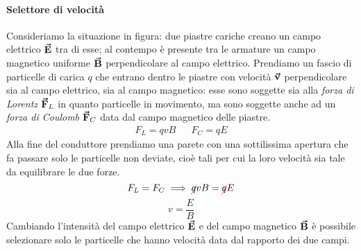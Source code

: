 \paragraph{Selettore di velocità}
Consideriamo la situazione in figura: due piastre cariche creano un campo elettrico $\vb*{\va{E}}$ tra di esse; al contempo è presente tra le armature un campo magnetico uniforme $\vb*{\va{B}}$ perpendicolare al campo elettrico.
Prendiamo un fascio di particelle di carica $q$ che entrano dentro le piastre con velocità $\vb*{\va{v}}$ perpendicolare sia al campo elettrico, sia al campo magnetico: esse sono soggette sia alla \textit{forza di Lorentz} $\vb*{\va{F}}_L$ in quanto particelle in movimento, ma sono soggette anche ad un \textit{forza di Coulomb} $\vb*{\va{F}}_C$ data dal campo magnetico delle piastre.
\begin{align*}
	F_L=qvB&&F_C=qE
\end{align*}
Alla fine del conduttore prendiamo una parete con una sottilissima apertura che fa passare solo le particelle non deviate, cioè tali per cui la loro velocità sia tale da equilibrare le due forze.
\begin{equation*}
	F_L=F_C\implies \Ccancel[red]{q}vB=\Ccancel[red]{q}E
\end{equation*}
\begin{equation}
	v=\frac{E}{B}
\end{equation}
Cambiando l'intensità del campo elettrico $\vb*{\va{E}}$ e del campo magnetico $\vb*{\va{B}}$ è possibile selezionare solo le particelle che hanno velocità data dal rapporto dei due campi.
